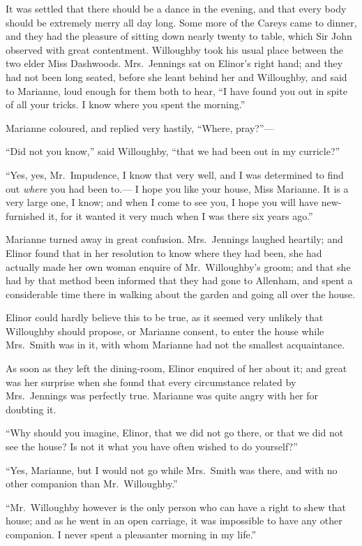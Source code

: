\documentclass{article}
\begin{document}
It was settled that there should be a dance in the evening,
and that every body should be extremely merry all day long.
Some more of the Careys came to dinner, and they had the
pleasure of sitting down nearly twenty to table, which Sir
John observed with great contentment.  Willoughby took
his usual place between the two elder Miss Dashwoods.
Mrs.\ Jennings sat on Elinor's right hand; and they had not
been long seated, before she leant behind her and Willoughby,
and said to Marianne, loud enough for them both to hear,
``I have found you out in spite of all your tricks.
I know where you spent the morning.''

Marianne coloured, and replied very hastily,
``Where, pray?''---%

``Did not you know,'' said Willoughby, ``that we had
been out in my curricle?''

``Yes, yes, Mr.\ Impudence, I know that very well,
and I was determined to find out \emph{where} you had been to.---%
I hope you like your house, Miss Marianne.  It is a very
large one, I know; and when I come to see you, I hope you
will have new-furnished it, for it wanted it very much
when I was there six years ago.''

Marianne turned away in great confusion.
Mrs.\ Jennings laughed heartily; and Elinor found that in her
resolution to know where they had been, she had actually
made her own woman enquire of Mr.\ Willoughby's groom;
and that she had by that method been informed that they
had gone to Allenham, and spent a considerable time there
in walking about the garden and going all over the house.

Elinor could hardly believe this to be true,
as it seemed very unlikely that Willoughby should propose,
or Marianne consent, to enter the house while Mrs.\ Smith was
in it, with whom Marianne had not the smallest acquaintance.

As soon as they left the dining-room, Elinor enquired
of her about it; and great was her surprise when she
found that every circumstance related by Mrs.\ Jennings
was perfectly true.  Marianne was quite angry with her
for doubting it.

``Why should you imagine, Elinor, that we did not
go there, or that we did not see the house?  Is not it
what you have often wished to do yourself?''

``Yes, Marianne, but I would not go while Mrs.\ Smith
was there, and with no other companion than Mr.\ Willoughby.''

``Mr.\ Willoughby however is the only person who can
have a right to shew that house; and as he went in an open
carriage, it was impossible to have any other companion.
I never spent a pleasanter morning in my life.''
\end{document}
